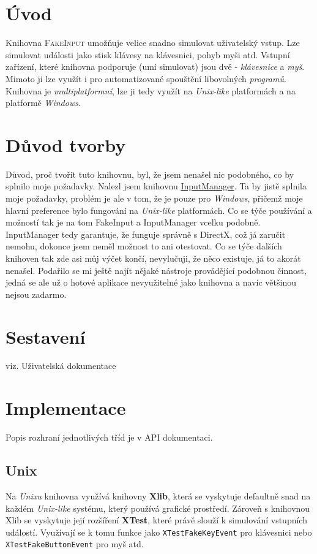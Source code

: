 \documentclass[12pt]{article}
\newcommand{\noun}[1]{\textsc{#1}}
\newcommand{\code}[1]{\texttt{#1}}
\begin{document}


\tableofcontents
\newpage

\section{Úvod}
Knihovna \noun{FakeInput} umožňuje velice snadno simulovat uživatelský vstup. Lze simulovat události jako stisk klávesy na klávesnici, pohyb myši atd. Vstupní zařízení, které knihovna podporuje (umí simulovat) jsou dvě - \emph{klávesnice} a \emph{myš}. Mimoto ji lze využít i pro automatizované spouštění libovolných \emph{programů}. Knihovna je \emph{multiplatformní}, lze ji tedy využít na \emph{Unix-like} platformách a na platformě \emph{Windows}.

\section{Důvod tvorby}
Důvod, proč tvořit tuto knihovnu, byl, že jsem nenašel nic podobného, co by splnilo moje požadavky. Nalezl jsem knihovnu \href{http://www.codeproject.com/KB/library/InputManager.aspx}{InputManager}. Ta by jistě splnila moje požadavky, problém je ale v tom, že je pouze pro \emph{Windows}, přičemž moje hlavní preference bylo fungování na \emph{Unix-like} platformách. Co se týče používání a možností tak je na tom FakeInput a InputManager vcelku podobně. InputManager tedy garantuje, že funguje správně s DirectX, což já zaručit nemohu, dokonce jsem neměl možnost to ani otestovat. Co se týče dalších knihoven tak zde asi můj výčet končí, nevylučuji, že něco existuje, já to akorát nenašel. Podařilo se mi ještě najít nějaké nástroje provádějící podobnou činnost, jedná se ale už o hotové aplikace nevyužitelné jako knihovna a navíc většinou nejsou zadarmo.

\section{Sestavení}
    viz. Uživatelská dokumentace

\section{Implementace}
    Popis rozhraní jednotlivých tříd je v API dokumentaci.

    \subsection{Unix}
    Na \emph{Unixu} knihovna využívá knihovny \textbf{Xlib},
    která se vyskytuje defaultně snad na každém \emph{Unix-like} systému, který používá grafické prostředí.
    Zároveň s knihovnou Xlib se vyskytuje její rozšíření \textbf{XTest}, které právě slouží k simulování vstupních událostí. Využívají se k tomu funkce jako \code{XTestFakeKeyEvent} pro klávesnici nebo \code{XTestFakeButtonEvent} pro myš atd.
\end{document}

